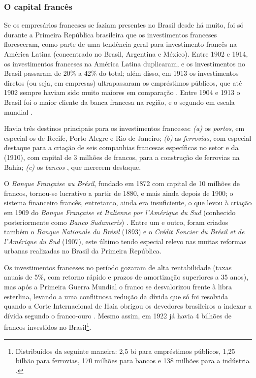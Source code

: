 \subsubsection{O capital francês}\label{subsubsec:capfran}

Se os empresários franceses se faziam presentes no Brasil desde há muito, foi só durante a Primeira República brasileira que os investimentos franceses floresceram, como parte de uma tendência geral para investimento francês na América Latina (concentrado no Brasil, Argentina e México). Entre 1902 e 1914, os investimentos franceses na América Latina duplicaram, e os investimentos no Brasil passaram de 20\% a 42\% do total; além disso, em 1913 os investimentos diretos (ou seja, em empresas) ultrapassaram os empréstimos públicos, que até 1902 sempre haviam sido muito maiores em comparação \cite[p~83-84]{mauro_empfran_1999}. Entre 1904 e 1913 o Brasil foi o maior cliente da banca francesa na região, e o segundo em escala mundial \cite{rippy_french_1949}. 

Havia três destinos principais para os investimentos franceses: \textit{(a)} os \textit{portos}, em especial os de Recife, Porto Alegre e Rio de Janeiro; \textit{(b)} as \textit{ferrovias}, com especial destaque para a criação de seis companhias francesas específicas no setor e da  (1910), com capital de 3 milhões de francos, para a construção de ferrovias na Bahia; \textit{(c)} os \textit{bancos} \cite[p~84]{mauro_empfran_1999}, que merecem destaque.

O \textit{Banque Française au Brésil}, fundado em 1872 com capital de 10 milhões de francos, tornou-se lucrativo a partir de 1880, e mais ainda depois de 1900; o sistema financeiro francês, entretanto, ainda era insuficiente, o que levou à criação em 1909 do \textit{Banque Française et Italienne por l'Amérique du Sud} (conhecido posteriormente como \textit{Banco Sudameris}) \cite[p~84]{mauro_empfran_1999}. Entre um e outro, foram criados também o \textit{Banque Nationale du Brésil} (1893) e o \textit{Crédit Foncier du Brésil et de l'Amérique du Sud} (1907), este último tendo especial relevo nas muitas reformas urbanas realizadas no Brasil da Primeira República.

Os investimentos franceses no período gozaram de alta rentabilidade (taxas anuais de 5\%, com retorno rápido e prazos de amortização superiores a 35 anos), mas após a Primeira Guerra Mundial o franco se desvalorizou frente à libra esterlina, levando a uma conflituosa redução da dívida que só foi resolvida quando a Corte Internacional de Haia obrigou os devedores brasileiros a indexar a dívida segundo o franco-ouro \cite[p.~87]{mauro_empfran_1999}. Mesmo assim, em 1922 já havia 4 bilhões de francos investidos no Brasil\footnote{Distribuídos da seguinte maneira: 2,5 bi para empréstimos públicos, 1,25 bilhão para ferrovias, 170 milhões para bancos e 138 milhões para a indústria \cite[p~84]{mauro_empfran_1999}.}.

